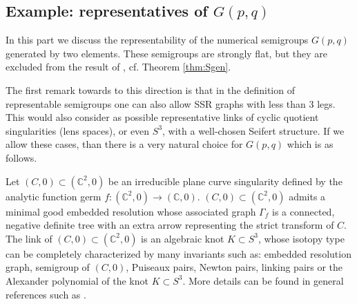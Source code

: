 \documentclass[oneside]{amsart}
\numberwithin{equation}{section}
\numberwithin{equation}{subsection}
\theoremstyle{plain}
\theoremstyle{definition}
\newtheorem{ex}[equation]{Example}
\def\C{\mathbb C}
\newcommand{\G}{\Gamma}
\begin{document}
% 
% 




\subsection{Example: representatives of $G(p,q)$} \label{s:gpq}

In this part we discuss the representability of the numerical semigroups $G(p,q)$ generated by two elements. These semigroups are strongly flat, but they are excluded from the result of \cite{stronglyflat}, cf. Theorem \ref{thm:Sgen}. 

The first remark towards to this direction is that in the definition of representable semigroups one can also allow SSR graphs with less than $3$ legs. This would also consider as possible representative links of cyclic quotient singularities (lens spaces), or even $S^3$, with a well-chosen Seifert structure. If we allow these cases, than there is a very natural choice for $G(p,q)$ which is as follows. 

Let $(C,0)\subset(\mathbb{C}^2,0)$ be an irreducible plane curve singularity defined by the analytic function germ $f:(\C^2,0)\to(\C,0)$. 
$(C,0)\subset(\mathbb{C}^2,0)$ admits a minimal good embedded resolution 
whose associated graph $\Gamma_f$ is a connected, negative definite tree
with an extra arrow representing the strict transform 
of $C$. The link of $(C,0)\subset(\mathbb{C}^2,0)$ is 
an algebraic knot $K\subset S^3$,
whose isotopy type can be completely characterized by many invariants such as: embedded resolution graph,
semigroup of $(C,0)$, Puiseaux pairs, Newton pairs, linking pairs or
the Alexander polynomial of the knot $K\subset S^3$. More details can be found in general references such as \cite{art_plane_sing,book_wall}.
\end{document}
